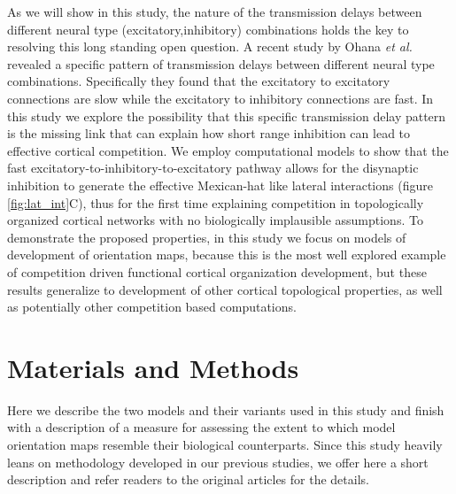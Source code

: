 \documentclass[utf8]{frontiersSCNS}
\newcommand{\etal}{\textit{et al.}}
\begin{document}
As we will show in this study, the nature of the transmission delays between different neural type (excitatory,inhibitory) combinations
holds the key to resolving this long standing open question. A recent study by Ohana \etal\,\citep{Ohana2012} revealed a specific pattern of transmission delays between different neural type combinations. Specifically they found that the excitatory to excitatory connections are slow while the excitatory to inhibitory connections are fast. In this study we explore the 
possibility that this specific transmission delay pattern is the missing link that can explain how short range inhibition can lead 
to effective cortical competition. We employ computational models to show that the fast excitatory-to-inhibitory-to-excitatory pathway allows for the disynaptic inhibition to generate the effective Mexican-hat like lateral interactions (figure \ref{fig:lat_int}C), thus for the first time 
explaining competition in topologically organized cortical networks with no biologically implausible assumptions. To demonstrate the
proposed properties, in this study we focus on models of development of orientation maps, because this is the most well explored
example of competition driven functional cortical organization development, but these results generalize to development of other
cortical topological properties, as well as potentially other competition based computations.


\section{Materials and Methods}

Here we describe the two models and their variants used in this study and finish with a description of a measure
for assessing the extent to which model orientation maps resemble their biological counterparts. Since this study heavily leans on methodology 
developed in our previous studies, we offer here a short description and refer readers to the original articles for the details.
\end{document}
